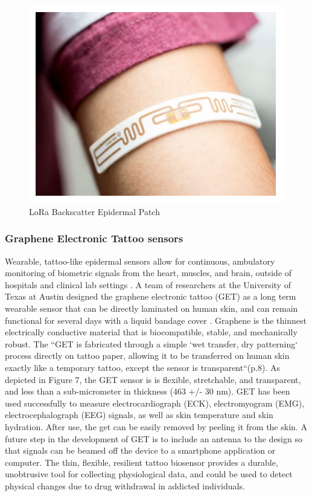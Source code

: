 \documentclass[sigconf]{acmart}
\begin{document}
\begin{figure}[!ht]
  \centering\includegraphics[width=\columnwidth]{images/Figure6.pdf}
  \caption{LoRa Backscatter Epidermal Patch \cite{talla17}
  }\label{f:Figure6}
\end{figure}

\subsubsection{Graphene Electronic Tattoo sensors}

Wearable, tattoo-like epidermal sensors allow for continuous, ambulatory 
monitoring of biometric signals from the heart, muscles, and brain, outside of
hospitals and clinical lab settings \cite{bourzac17}. A team of researchers at 
the University of Texas at Austin designed the graphene electronic tattoo (GET)
as a long term wearable sensor that can be directly laminated on human skin, 
and can remain functional for several days with a liquid bandage cover 
\cite{ameri17}. Graphene is the thinnest electrically conductive material
that is biocompatible, stable, and mechanically robust. The ``GET is 
fabricated through a simple `wet transfer, dry patterning` process directly
on tattoo paper, allowing it to be transferred  on human skin exactly like 
a temporary tattoo, except the sensor is transparent``(p.8)\cite{ameri17}. 
As depicted in Figure 7, the GET sensor is is flexible, stretchable, and 
transparent, and less than a sub-micrometer in thickness (463 +/- 30 nm). 
GET has been used successfully to measure electrocardiograph (ECK), 
electromyogram (EMG), electrocephalograph (EEG) signals, as well as skin 
temperature and skin hydration. After use, the get can be easily removed by 
peeling it from the skin. A future step in the development of GET is to include
an antenna to the design so that signals can be beamed off the device to a
smartphone application or computer. The thin, flexible, resilient tattoo 
biosensor provides a durable, unobtrusive tool for collecting physiological 
data, and could be used to detect physical changes due to drug withdrawal 
in addicted individuals. 
\end{document}
